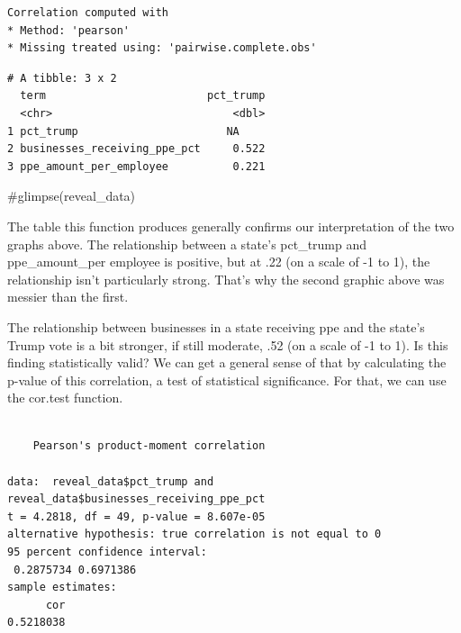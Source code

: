 \documentclass[
  letterpaper,
  DIV=11,
  numbers=noendperiod]{scrreprt}
\newenvironment{Shaded}{\begin{snugshade}}{\end{snugshade}}
\newcommand{\CommentTok}[1]{\textcolor[rgb]{0.37,0.37,0.37}{#1}}
\newcommand{\FunctionTok}[1]{\textcolor[rgb]{0.28,0.35,0.67}{#1}}
\newcommand{\NormalTok}[1]{\textcolor[rgb]{0.00,0.23,0.31}{#1}}
\newcommand{\SpecialCharTok}[1]{\textcolor[rgb]{0.37,0.37,0.37}{#1}}
\begin{document}
\begin{verbatim}
Correlation computed with
* Method: 'pearson'
* Missing treated using: 'pairwise.complete.obs'
\end{verbatim}

\begin{verbatim}
# A tibble: 3 x 2
  term                         pct_trump
  <chr>                            <dbl>
1 pct_trump                       NA    
2 businesses_receiving_ppe_pct     0.522
3 ppe_amount_per_employee          0.221
\end{verbatim}

\begin{Shaded}
\begin{Highlighting}[]
\CommentTok{\#glimpse(reveal\_data)}
\end{Highlighting}
\end{Shaded}

The table this function produces generally confirms our interpretation
of the two graphs above. The relationship between a state's pct\_trump
and ppe\_amount\_per employee is positive, but at .22 (on a scale of -1
to 1), the relationship isn't particularly strong. That's why the second
graphic above was messier than the first.

The relationship between businesses in a state receiving ppe and the
state's Trump vote is a bit stronger, if still moderate, .52 (on a scale
of -1 to 1). Is this finding statistically valid? We can get a general
sense of that by calculating the p-value of this correlation, a test of
statistical significance. For that, we can use the cor.test function.

\begin{Shaded}
\end{Shaded}

\begin{verbatim}

    Pearson's product-moment correlation

data:  reveal_data$pct_trump and reveal_data$businesses_receiving_ppe_pct
t = 4.2818, df = 49, p-value = 8.607e-05
alternative hypothesis: true correlation is not equal to 0
95 percent confidence interval:
 0.2875734 0.6971386
sample estimates:
      cor 
0.5218038 
\end{verbatim}
\end{document}
